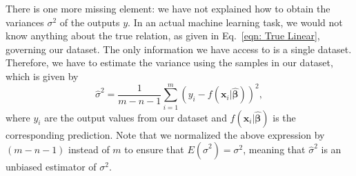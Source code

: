 There is one more  missing element: we have not explained how to obtain the variances $\sigma^2$ of the outputs $y$. In an actual machine learning task, we would not know anything about the true relation, as given in Eq.~\eqref{eqn: True Linear}, governing our dataset. The only information we have access to is a single dataset. Therefore, we have to estimate the variance using the samples in our dataset, which is given by
\begin{equation}
    \hat{\sigma}^2 = \frac{1}{m - n - 1}\sum_{i=1}^{m} (y_{i} - f(\bm{x}_i|\hat{\bm{\beta}}))^2,
\end{equation}
where $y_i$ are the output values from our dataset and $f(\bm{x}_i|\hat{\bm{\beta}})$ is the corresponding prediction. Note that we normalized the above expression by $(m - n - 1)$ instead of $m$ to ensure that $E(\hat{\sigma}^2) = \sigma^2$, meaning that $\hat{\sigma}^2$ is an unbiased estimator of $\sigma^2$.


